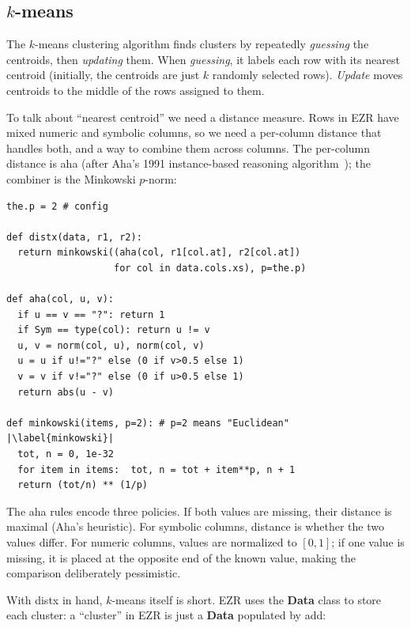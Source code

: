 \documentclass[AMA,STIX2COL]{WileyNJDv5}
\newcommand{\IT}{{\sffamily EZR}}
\newcommand{\cls}[1]{%
  \setlength{\fboxsep}{1.5pt}%
  \colorbox{clsbg}{\sffamily\bfseries{#1}}%
}
\begin{document}
\subsection{$k$-means}\label{kluster}

The $k$-means clustering algorithm finds clusters by repeatedly
{\em guessing} the centroids, then {\em updating} them.  When
{\em guessing}, it labels each row with its nearest centroid
(initially, the centroids are just $k$ randomly selected rows).
{\em Update} moves centroids to the middle of the rows assigned
to them.

To talk about ``nearest centroid'' we need a distance measure. Rows in
\IT{} have mixed numeric and symbolic columns, so we need a
per-column distance that handles both, and a way to combine them
across columns. The per-column distance is \textsf{aha} (after
Aha's 1991 instance-based reasoning algorithm~\cite{aha91}); the
combiner is the Minkowski $p$-norm:

\begin{lstlisting}
the.p = 2 # config

def distx(data, r1, r2):
  return minkowski((aha(col, r1[col.at], r2[col.at])
                   for col in data.cols.xs), p=the.p)

def aha(col, u, v):
  if u == v == "?": return 1
  if Sym == type(col): return u != v
  u, v = norm(col, u), norm(col, v)
  u = u if u!="?" else (0 if v>0.5 else 1)
  v = v if v!="?" else (0 if u>0.5 else 1)
  return abs(u - v)

def minkowski(items, p=2): # p=2 means "Euclidean"  |\label{minkowski}|
  tot, n = 0, 1e-32
  for item in items:  tot, n = tot + item**p, n + 1
  return (tot/n) ** (1/p)
\end{lstlisting}
The \textsf{aha} rules encode three   policies. If both
values are missing, their distance is maximal (Aha's
heuristic). For symbolic columns, distance is whether the two
values differ. For numeric columns, values are normalized to
$[0,1]$; if one value is missing, it is placed at the opposite
end of the known value, making the comparison deliberately
pessimistic.

With \textsf{distx} in hand, $k$-means itself is short. EZR uses
the \cls{Data} class to store each cluster: a ``cluster'' in
\IT{} is just a \cls{Data} populated by \textsf{add}:
\end{document}
